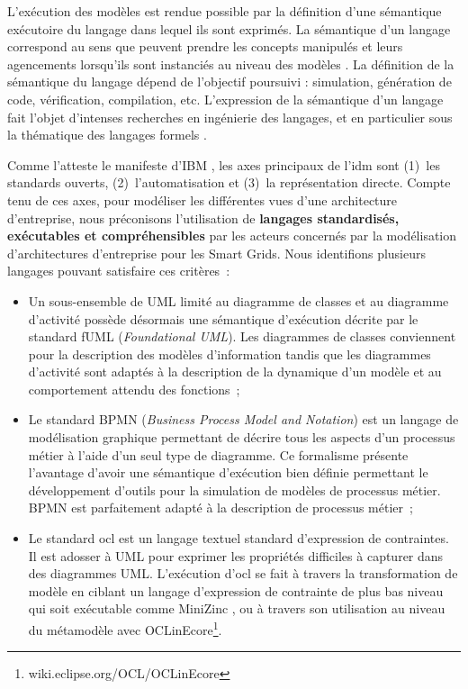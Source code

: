 L'exécution des modèles est rendue possible par la définition d'une sémantique exécutoire du langage dans lequel ils sont exprimés. La sémantique d'un langage correspond au sens que peuvent prendre les concepts manipulés et leurs agencements lorsqu'ils sont instanciés au niveau des modèles \cite{jezequel2012ingenierie}. La définition de la sémantique du langage dépend de l'objectif poursuivi : simulation, génération de code, vérification, compilation, etc. L'expression de la sémantique d'un langage fait l'objet d'intenses recherches en ingénierie des langages, et en particulier sous la thématique des langages formels \cite{kleppe2007language}. 

Comme l'atteste le manifeste d'IBM \cite{chesbrough2006research}, les axes principaux de l'\gls{idm} sont (1)~les standards ouverts, (2)~l'automatisation et (3)~la représentation directe. Compte tenu de ces axes, pour modéliser les différentes vues d'une architecture d'entreprise, nous préconisons l'utilisation de \textbf{langages standardisés, exécutables et compréhensibles} par les acteurs concernés par la modélisation d'architectures d'entreprise pour les Smart Grids. 
Nous identifions plusieurs langages pouvant satisfaire ces critères~:

\begin{itemize}

\item Un sous-ensemble de UML limité au diagramme de classes et au diagramme d'activité possède désormais une sémantique d'exécution décrite par le standard fUML (\textit{Foundational UML}). Les diagrammes de classes conviennent pour la description des modèles d'information tandis que les diagrammes d'activité sont adaptés à la description de la dynamique d'un modèle et au comportement attendu des fonctions~;

\item Le standard BPMN (\textit{Business Process Model and Notation}) est un langage de modélisation graphique permettant de décrire tous les aspects d'un processus métier à l'aide d'un seul type de diagramme. Ce formalisme présente l'avantage d'avoir une sémantique d'exécution bien définie permettant le développement d'outils pour la simulation de modèles de processus métier. BPMN est parfaitement adapté à la description de processus métier~;
\item Le standard \gls{ocl} est un langage textuel standard d'expression de contraintes. Il est adosser à UML pour exprimer les propriétés difficiles à capturer dans des diagrammes UML. L'exécution d'\gls{ocl} se fait à travers la transformation de modèle en ciblant un langage d'expression de contrainte de plus bas niveau qui soit exécutable comme MiniZinc \cite{nethercote2007minizinc}, ou à travers son utilisation au niveau du métamodèle avec OCLinEcore\footnote{wiki.eclipse.org/OCL/OCLinEcore}.

\end{itemize}











